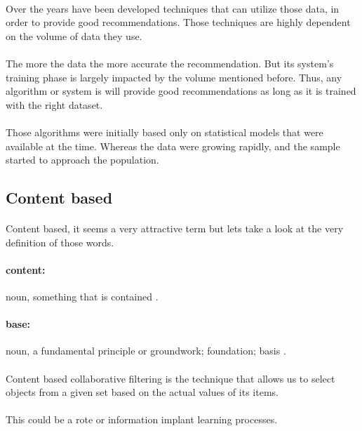 \paragraph{}Over the years have been developed techniques that can utilize those data, in order to provide good recommendations. Those techniques are highly dependent on the volume of data they use. 

\paragraph{}The more the data the more accurate the recommendation. But its system's training phase is largely impacted by the volume mentioned before. Thus, any algorithm or system is will provide good recommendations as long as it is trained with the right dataset.

\paragraph{} Those algorithms were initially based only on statistical models that were available at the time. Whereas the data were growing rapidly, and the sample started to approach the population.
\subsection{Content based}
\paragraph{} Content based, it seems a very attractive term but lets take a look at the very definition of those words.
\paragraph{content:} noun, something that is contained \cite{Dictionary.com2017}.
\paragraph{base:} noun, a fundamental principle or groundwork; foundation; basis \cite{Dictionary.com2017}.

\paragraph{}Content based collaborative filtering is the technique that allows us to select objects from a given set based on the actual values of its items.
\paragraph{} This could be a rote or information implant learning processes.


